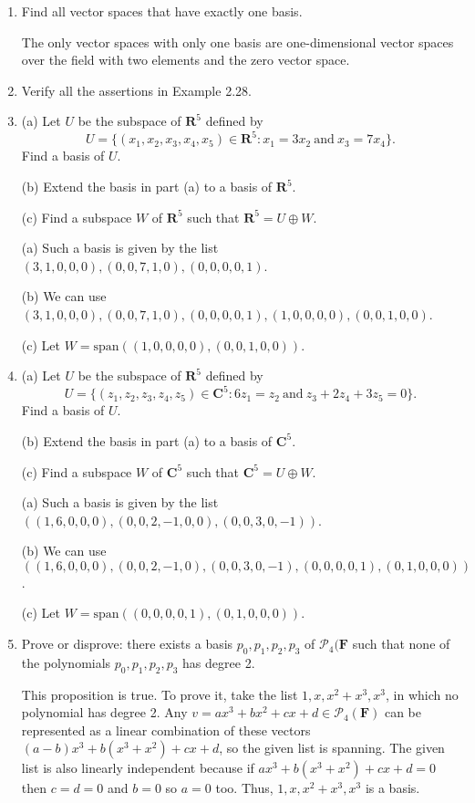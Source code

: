 \documentclass{book}
\begin{document}
\begin{enumerate}
\item Find all vector spaces that have exactly one basis.

The only vector spaces with only one basis are one-dimensional vector spaces over the field with two elements and the zero vector space.

\item Verify all the assertions in Example 2.28.

\item (a) Let \(U\) be the subspace of \(\textbf{R}^5\) defined by \[U=\{(x_1,x_2,x_3,x_4,x_5) \in \textbf{R}^5:x_1=3x_2 \ \textrm{and} \ x_3=7x_4 \}.\] Find a basis of \(U\).

(b) Extend the basis in part (a) to a basis of \(\textbf{R}^5\).

(c) Find a subspace \(W\) of \(\textbf{R}^5\) such that \(\textbf{R}^5 = U \oplus W\).

(a) Such a basis is given by the list \((3,1,0,0,0),(0,0,7,1,0),(0,0,0,0,1)\).

(b) We can use \((3,1,0,0,0),(0,0,7,1,0),(0,0,0,0,1),(1,0,0,0,0),(0,0,1,0,0)\).

(c) Let \(W = \textrm{span}((1,0,0,0,0),(0,0,1,0,0))\).

\item (a) Let \(U\) be the subspace of \(\textbf{R}^5\) defined by \[U=\{(z_1,z_2,z_3,z_4,z_5) \in \textbf{C}^5:6z_1=z_2 \ \textrm{and} \ z_3+2z_4+3z_5=0\}.\] Find a basis of \(U\).

(b) Extend the basis in part (a) to a basis of \(\textbf{C}^5\).

(c) Find a subspace \(W\) of \(\textbf{C}^5\) such that \(\textbf{C}^5 = U \oplus W\).

(a) Such a basis is given by the list \(((1,6,0,0,0),(0,0,2,-1,0,0),(0,0,3,0,-1))\).

(b) We can use \(((1,6,0,0,0),(0,0,2,-1,0),(0,0,3,0,-1),(0,0,0,0,1),(0,1,0,0,0))\).

(c) Let \(W = \textrm{span}((0,0,0,0,1),(0,1,0,0,0))\).

\item Prove or disprove: there exists a basis \(p_0,p_1,p_2,p_3\) of \(\mathcal{P}_4(\textbf{F}\) such that none of the polynomials \(p_0,p_1,p_2,p_3\) has degree 2.

This proposition is true.  To prove it, take the list \(1,x,x^2+x^3,x^3\), in which no polynomial has degree 2.  Any \(v=ax^3+bx^2+cx+d \in \mathcal{P}_4(\textbf{F})\) can be represented as a linear combination of these vectors \((a-b)x^3+b(x^3+x^2)+cx+d\), so the given list is spanning.  The given list is also linearly independent because if \(ax^3+b(x^3+x^2)+cx+d=0\) then \(c=d=0\) and \(b=0\) so \(a=0\) too.  Thus, \(1,x,x^2+x^3,x^3\) is a basis.


\end{enumerate}
\end{document}
